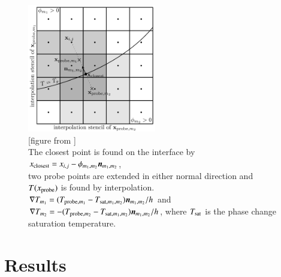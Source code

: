 \documentclass[preprint,12pt]{Definitions/elsarticle}
\newcommand{\tn}{\textnormal}
\newcommand{\bmn}{\mbox{\boldmath $n$\unboldmath}}
\begin{document}
\begin{figure}[h!]
	\centering
	\includegraphics[width=0.5\textwidth]{vahab_probept.PNG}
	\caption{[figure from \cite{VAHAB2021}] \\
		The closest point is found on the interface by $x_\tn{closest}=x_{i,j}-\phi_{m_1,m_2}\bmn_{m_1,m_2}$,\\
		two probe points are extended in either normal direction and $T(x_\tn{probe})$ is found by interpolation.\\
		$\nabla T_{m_1}=(T_{\tn{probe},m_1}-T_{\tn{sat},m_1,m_2})\bmn_{m_1,m_2}/h$ and 
		$\nabla T_{m_2}=-(T_{\tn{probe},m_2}-T_{\tn{sat},m_1,m_2})\bmn_{m_1,m_2}/h$, where $T_\tn{sat}$ is the phase change saturation temperature.
	}
	\label{fig:tempgrad}
\end{figure}

\section{Results}
\end{document}
